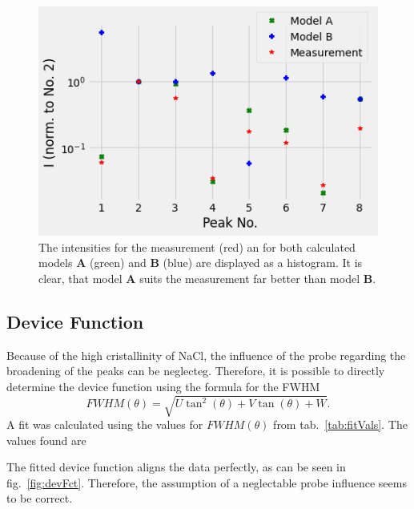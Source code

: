 \begin{figure}[ht]
    \centering
    \includegraphics[width = 0.8\linewidth]{Bilder/Auswertung/NaCl/IntsModels.png}
    \caption{The intensities for the measurement (red) an for both calculated models \textbf{A} (green) and \textbf{B} (blue) are displayed as a histogram. It is clear, that model \textbf{A} suits the measurement far better than model \textbf{B}.}
    \label{fig:histoInts}
\end{figure}

\subsection*{Device Function}

Because of the high cristallinity of NaCl, the influence of the probe regarding the broadening of the peaks can be neglecteg. Therefore, it is possible to directly determine the device function using the formula for the FWHM 
\begin{equation}
    FWHM(\theta) = \sqrt{U \tan^2(\theta) + V \tan(\theta) + W}.
\end{equation}
A fit was calculated using the values for $FWHM(\theta)$ from tab.~\ref{tab:fitVals}. The values found are \par 
\centerline{} \par
The fitted device function aligns the data perfectly, as can be seen in fig.~\ref{fig:devFct}. Therefore, the assumption of a neglectable probe influence seems to be correct.

